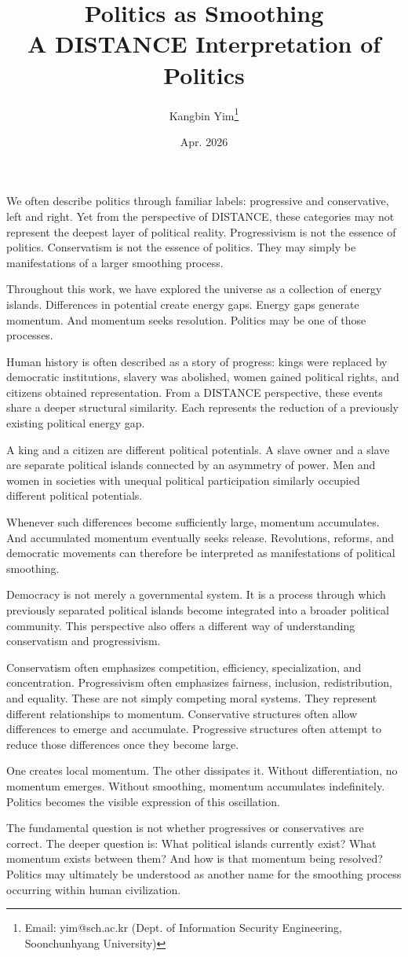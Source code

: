 \documentclass[12pt]{article}
\title{Politics as Smoothing\\A DISTANCE Interpretation of Politics}
\author{Kangbin Yim\thanks{Email: yim@sch.ac.kr (Dept. of Information Security Engineering, Soonchunhyang University)}}
\date{Apr. 2026}
\begin{document}
\maketitle

We often describe politics through familiar labels: progressive and conservative, left and right.
Yet from the perspective of DISTANCE, these categories may not represent the deepest layer of political reality.
Progressivism is not the essence of politics.
Conservatism is not the essence of politics.
They may simply be manifestations of a larger smoothing process.

Throughout this work, we have explored the universe as a collection of energy islands.
Differences in potential create energy gaps.
Energy gaps generate momentum.
And momentum seeks resolution.
Politics may be one of those processes.

Human history is often described as a story of progress:
kings were replaced by democratic institutions, slavery was abolished,
women gained political rights, and citizens obtained representation.
From a DISTANCE perspective, these events share a deeper structural similarity.
Each represents the reduction of a previously existing political energy gap.

A king and a citizen are different political potentials.
A slave owner and a slave are separate political islands connected by an asymmetry of power.
Men and women in societies with unequal political participation similarly occupied different political potentials.

Whenever such differences become sufficiently large, momentum accumulates.
And accumulated momentum eventually seeks release.
Revolutions, reforms, and democratic movements can therefore be interpreted as manifestations of political smoothing.

Democracy is not merely a governmental system.
It is a process through which previously separated political islands become integrated into a broader political community.
This perspective also offers a different way of understanding conservatism and progressivism.

Conservatism often emphasizes competition, efficiency, specialization, and concentration.
Progressivism often emphasizes fairness, inclusion, redistribution, and equality.
These are not simply competing moral systems.
They represent different relationships to momentum.
Conservative structures often allow differences to emerge and accumulate.
Progressive structures often attempt to reduce those differences once they become large.

One creates local momentum.
The other dissipates it.
Without differentiation, no momentum emerges.
Without smoothing, momentum accumulates indefinitely.
Politics becomes the visible expression of this oscillation.

The fundamental question is not whether progressives or conservatives are correct.
The deeper question is:
What political islands currently exist?
What momentum exists between them?
And how is that momentum being resolved?
Politics may ultimately be understood as another name for the smoothing process occurring within human civilization.
\end{document}
